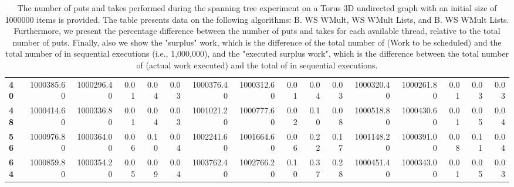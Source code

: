\begin{table}[!ht]
{\begin{tabular}{lrrrrrrrrrrrrrrr}
\textbf{40} &  1000385.60 & 1000296.40 &           0.01 &        0.04 &                 0.03 &     1000376.40 & 1000312.60 &           0.01 &        0.04 &                 0.03 &        1000320.40 & 1000261.80 &           0.01 &        0.03 &                 0.03 \\
\textbf{48} &  1000414.60 & 1000336.80 &           0.01 &        0.04 &                 0.03 &     1001021.20 & 1000777.60 &           0.02 &        0.10 &                 0.08 &        1000518.80 & 1000430.60 &           0.01 &        0.05 &                 0.04 \\
\textbf{56} &  1000976.80 & 1000364.00 &           0.06 &        0.10 &                 0.04 &     1002241.60 & 1001664.60 &           0.06 &        0.22 &                 0.17 &        1001148.20 & 1000391.00 &           0.08 &        0.11 &                 0.04 \\
\textbf{64} &  1000859.80 & 1000354.20 &           0.05 &        0.09 &                 0.04 &     1003762.40 & 1002766.20 &           0.10 &        0.37 &                 0.28 &        1000451.40 & 1000343.00 &           0.01 &        0.05 &                 0.03 \\
\bottomrule
\end{tabular}}
\label{difference-Torus_3D_undirected-1000000-B_WS_NC_MULT_OPT-WS_NC_MULT_LA_OPT-B_WS_NC_MULT_LA_OPT}
\caption{The number of puts and takes performed during the
    spanning tree experiment on a Torus 3D undirected graph with an initial size
    of 1000000 items is provided. The table presents data on the
    following algorithms: B. WS WMult, WS WMult Lists, and
    B. WS WMult Lists. Furthermore, we present the percentage difference
    between the number of puts and takes for each available thread,
    relative to the total number of puts. Finally, also we show the
    "surplus" work, which is the difference of the total number of
    \Puts (Work to be scheduled) and the total number of \Puts in
    sequential executions (i.e., 1,000,000), and the "executed surplus
    work", which is the difference between the total number of \Takes
    (actual work executed) and the total of \Takes in sequential
    executions.}
\end{table}
